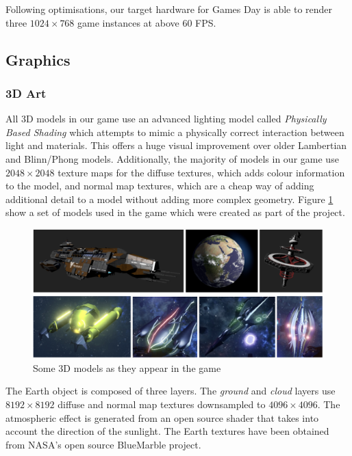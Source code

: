 \documentclass[a4paper,11pt]{article}
\begin{document}
Following optimisations, our target hardware for Games Day is able to render three $1024 \times 768$ game instances at above 60 FPS.

\subsection{Graphics}

\subsubsection{3D Art}
All 3D models in our game use an advanced lighting model called \emph{Physically Based Shading} which attempts to mimic a physically correct interaction between light and materials. This offers a huge visual improvement over older Lambertian and Blinn/Phong models.  Additionally, the majority of models in our game use $2048 \times 2048$ texture maps for the diffuse textures, which adds colour information to the model, and normal map textures, which are a cheap way of adding additional detail to a model without adding more complex geometry. Figure \ref{fig:models} show a set of models used in the game which were created as part of the project.

\begin{figure}[ht]
	\centering
	\includegraphics[width=\textwidth]{images/3DArt}
    \caption{Some 3D models as they appear in the game}
    \label{fig:models}
\end{figure}

The Earth object is composed of three layers. The \emph{ground} and \emph{cloud} layers use $8192 \times 8192$ diffuse and normal map textures downsampled to $4096 \times 4096$. The atmospheric effect is generated from an open source shader \cite{atmospheric_shader} that takes into account the direction of the sunlight. The Earth textures have been obtained from NASA’s open source BlueMarble \cite{blue_marble} project.
\end{document}
